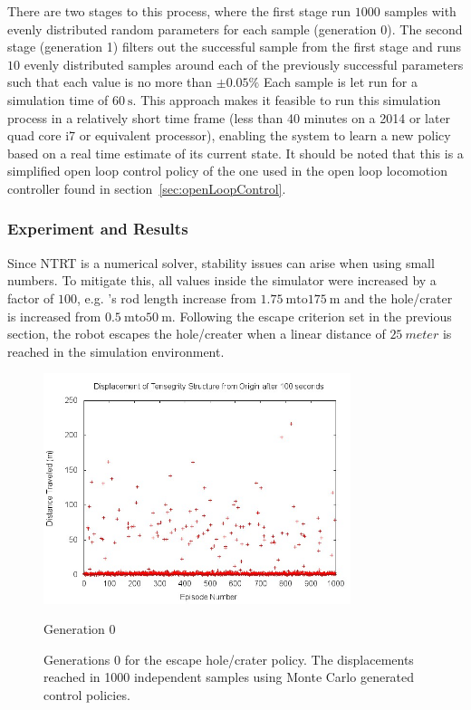 There are two stages to this process, where the first stage run \(1000\) samples with evenly distributed random parameters for each sample (generation 0).
The second stage (generation 1) filters out the successful sample from the first stage and runs \(10\) evenly distributed samples around each of the previously successful parameters such that each value is no more than \(\pm 0.05\%\)
Each sample is let run for a simulation time of \(\SI{60}{\second}\).
This approach makes it feasible to run this simulation process in a relatively short time frame (less than 40 minutes on a 2014 or later quad core i7 or equivalent processor), enabling the system to learn a new policy based on a real time estimate of its current state.
It should be noted that this is a simplified open loop control policy of the one used in the open loop locomotion controller found in section~\ref{sec:openLoopControl}.

\subsubsection{Experiment and Results}
Since NTRT is a numerical solver, stability issues can arise when using small numbers.
To mitigate this, all values inside the simulator were increased by a factor of \(100\), e.g. \SB{}'s rod length increase from \(\SI{1.75}{\meter} \text{to} \SI{175}{\meter}\) and the hole/crater is increased from \(\SI{0.5}{\meter} \text{to} \SI{50}{\meter}\).
Following the escape criterion set in the previous section, the robot escapes the hole/creater when a linear distance of \(\SI{25}{meter}\) is reached in the simulation environment.

\begin{figure}[thpb]
\centering
\includegraphics[width=0.8\textwidth]{tex/ARMS_2015/Pictures/gen0distances.jpg}
\caption{Generation 0}
\label{gen0scatter}
\caption{Generations 0 for the escape hole/crater policy. The displacements reached in 1000 independent samples using Monte Carlo generated control policies.}
\end{figure}

